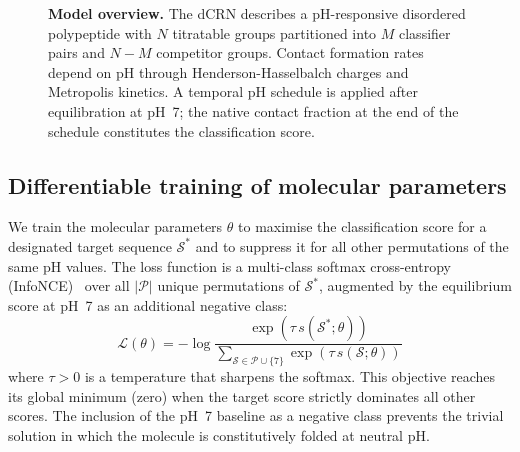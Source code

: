 \documentclass[10pt,twocolumn]{article}
\begin{document}
\begin{figure}[H]
  \centering
  \caption{\textbf{Model overview.}
    The dCRN describes a pH-responsive disordered polypeptide with
    $N$ titratable groups partitioned into $M$ classifier pairs and
    $N-M$ competitor groups.
    Contact formation rates depend on pH through Henderson-Hasselbalch
    charges and Metropolis kinetics.
    A temporal pH schedule is applied after equilibration at pH~7;
    the native contact fraction at the end of the schedule constitutes
    the classification score.}
  \label{fig:schematic}
\end{figure}

\subsection{Differentiable training of molecular parameters}

We train the molecular parameters $\theta$ to maximise the classification score for a designated target sequence $\mathcal{S}^*$ and to suppress it for all other permutations of the same pH values.
The loss function is a multi-class softmax cross-entropy (InfoNCE)~\cite{oord2018} over all $|\mathcal{P}|$ unique permutations of $\mathcal{S}^*$, augmented by the equilibrium score at pH~7 as an additional negative class:
\begin{equation}
  \mathcal{L}(\theta) = -\log \frac{\exp(\tau\, s(\mathcal{S}^*;\theta))}{\displaystyle\sum_{\mathcal{S}\in\mathcal{P}\cup\{7\}}\exp(\tau\,s(\mathcal{S};\theta))}
  \label{eq:loss}
\end{equation}
where $\tau > 0$ is a temperature that sharpens the softmax.
This objective reaches its global minimum (zero) when the target score strictly dominates all other scores.
The inclusion of the pH~7 baseline as a negative class prevents the trivial solution in which the molecule is constitutively folded at neutral pH.
\end{document}
